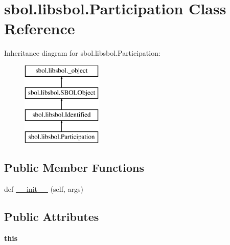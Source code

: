 \hypertarget{classsbol_1_1libsbol_1_1_participation}{}\section{sbol.\+libsbol.\+Participation Class Reference}
\label{classsbol_1_1libsbol_1_1_participation}
Inheritance diagram for sbol.\+libsbol.\+Participation\+:\begin{figure}[H]
\begin{center}
\leavevmode
\includegraphics[height=4.000000cm]{classsbol_1_1libsbol_1_1_participation}
\end{center}
\end{figure}
\subsection*{Public Member Functions}
\begin{DoxyCompactItemize}
\item 
def \hyperlink{classsbol_1_1libsbol_1_1_participation_abdb12b708c0c470e3760031e8460f98c}{\+\_\+\+\_\+init\+\_\+\+\_\+} (self, args)
\end{DoxyCompactItemize}
\subsection*{Public Attributes}
\begin{DoxyCompactItemize}
\item 
{\bfseries this}\hypertarget{classsbol_1_1libsbol_1_1_participation_abd41f30220d0a771db4db0a9c0e74294}{}\label{classsbol_1_1libsbol_1_1_participation_abd41f30220d0a771db4db0a9c0e74294}

\end{DoxyCompactItemize}
